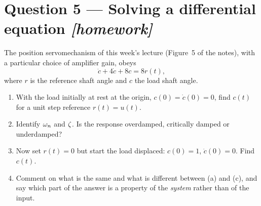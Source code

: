 \documentclass[11pt,a4paper]{article}
\newcommand{\athome}{\hfill{\small\color{fflag}\itshape[homework]}}
\begin{document}
\section*{Question 5 --- Solving a differential equation \athome}

The position servomechanism of this week's lecture (Figure~5 of the notes),
with a particular choice of amplifier gain, obeys
\[
  \ddot{c}+4\dot{c}+8c=8r(t),
\]
where $r$ is the reference shaft angle and $c$ the load shaft angle.

\begin{enumerate}[label=(\alph*)]
\item With the load initially at rest at the origin, $c(0)=\dot c(0)=0$, find
      $c(t)$ for a unit step reference $r(t)=u(t)$.
\item Identify $\omega_{n}$ and $\zeta$. Is the response overdamped, critically damped
      or underdamped?
\item Now set $r(t)=0$ but start the load displaced: $c(0)=1$,
      $\dot c(0)=0$. Find $c(t)$.
\item Comment on what is the same and what is different between (a) and (c),
      and say which part of the answer is a property of the \emph{system}
      rather than of the input.
\end{enumerate}
\end{document}
